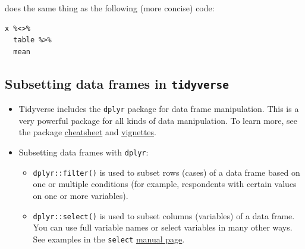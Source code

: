 \documentclass[
]{book}
\newenvironment{Shaded}{\begin{snugshade}}{\end{snugshade}}
\newcommand{\CommentTok}[1]{\textcolor[rgb]{0.56,0.35,0.01}{\textit{#1}}}
\newcommand{\FunctionTok}[1]{\textcolor[rgb]{0.00,0.00,0.00}{#1}}
\newcommand{\NormalTok}[1]{#1}
\newcommand{\OtherTok}[1]{\textcolor[rgb]{0.56,0.35,0.01}{#1}}
\newcommand{\SpecialCharTok}[1]{\textcolor[rgb]{0.00,0.00,0.00}{#1}}
\providecommand{\tightlist}{%
  \setlength{\itemsep}{0pt}\setlength{\parskip}{0pt}}
\begin{document}
does the same thing as the following (more concise) code:

\begin{verbatim}
x %<>%
  table %>%
  mean
\end{verbatim}

\hypertarget{subsetting-data-frames-in-tidyverse}{%
\subsection{\texorpdfstring{Subsetting data frames in \texttt{tidyverse}}{Subsetting data frames in tidyverse}}\label{subsetting-data-frames-in-tidyverse}}

\begin{itemize}
\tightlist
\item
  Tidyverse includes the \texttt{dplyr} package for data frame manipulation. This is a very powerful package for all kinds of data manipulation. To learn more, see the package \href{https://www.rstudio.com/wp-content/uploads/2015/02/data-wrangling-cheatsheet.pdf}{cheatsheet} and \href{https://dplyr.tidyverse.org/articles/index.html}{vignettes}.
\item
  Subsetting data frames with \texttt{dplyr}:

  \begin{itemize}
  \tightlist
  \item
    \texttt{dplyr::filter()} is used to subset rows (cases) of a data frame based on one or multiple conditions (for example, respondents with certain values on one or more variables).
  \item
    \texttt{dplyr::select()} is used to subset columns (variables) of a data frame. You can use full variable names or select variables in many other ways. See examples in the \texttt{select} \href{https://dplyr.tidyverse.org/reference/select.html}{manual page}.
  \end{itemize}
\end{itemize}

\begin{Shaded}
\end{Shaded}
\end{document}
